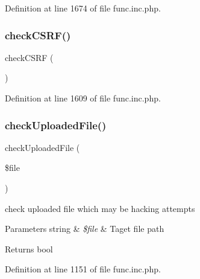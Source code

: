 Definition at line 1674 of file func.\+inc.\+php.

\hypertarget{func_8inc_8php_a887fd7fe841f5dac3179296ae770172a}{}\label{func_8inc_8php_a887fd7fe841f5dac3179296ae770172a} 
\subsubsection{\texorpdfstring{check\+C\+S\+R\+F()}{checkCSRF()}}
{\footnotesize\ttfamily check\+C\+S\+RF (\begin{DoxyParamCaption}{ }\end{DoxyParamCaption})}



Definition at line 1609 of file func.\+inc.\+php.

\hypertarget{func_8inc_8php_a771c122bb7a5b7038f7f751f5e2129b9}{}\label{func_8inc_8php_a771c122bb7a5b7038f7f751f5e2129b9} 
\subsubsection{\texorpdfstring{check\+Uploaded\+File()}{checkUploadedFile()}}
{\footnotesize\ttfamily check\+Uploaded\+File (\begin{DoxyParamCaption}\item[{}]{\$file }\end{DoxyParamCaption})}

check uploaded file which may be hacking attempts


\begin{DoxyParams}[1]{Parameters}
string & {\em \$file} & Taget file path \\
\hline
\end{DoxyParams}
\begin{DoxyReturn}{Returns}
bool 
\end{DoxyReturn}


Definition at line 1151 of file func.\+inc.\+php.

\hypertarget{func_8inc_8php_a56536fb66de4e320aaac07b82e6c2e21}{}\label{func_8inc_8php_a56536fb66de4e320aaac07b82e6c2e21} 

